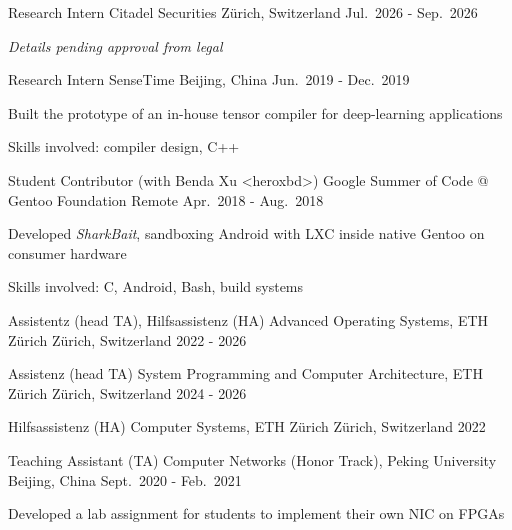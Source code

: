 
\begin{cventries}
    \cventry
    {Research Intern}
    {Citadel Securities}
    {Z\"urich, Switzerland}
    {Jul.\ 2026 - Sep.\ 2026}
    {
        \begin{cvitems}
            \item {\emph{Details pending approval from legal}}
        \end{cvitems}
    }

    \cventry
    {Research Intern}
    {SenseTime}
    {Beijing, China}
    {Jun.\ 2019 - Dec.\ 2019}
    {
        \begin{cvitems}
            \item {Built the prototype of an in-house tensor compiler for
                deep-learning applications}
            \item {Skills involved: compiler design, C++}
        \end{cvitems}
    }

    \cventry
    {Student Contributor (with Benda Xu <heroxbd>)} %
    {Google Summer of Code @ Gentoo Foundation} %
    {Remote} %
    {Apr.\ 2018 - Aug.\ 2018} %
    {
        \begin{cvitems}
            \item {Developed \emph{SharkBait}, sandboxing Android with LXC
                inside native Gentoo on consumer hardware}
            \item {Skills involved: C, Android, Bash, build systems}
        \end{cvitems}
    }
\end{cventries}


\begin{cventries}
    \cventry
    {Assistentz (head TA), Hilfsassistenz (HA)}
    {Advanced Operating Systems, ETH Z\"urich}
    {Z\"urich, Switzerland}
    {2022 - 2026}
    {}

    \cventry
    {Assistenz (head TA)}
    {System Programming and Computer Architecture, ETH Z\"urich}
    {Z\"urich, Switzerland}
    {2024 - 2026}
    {}

    \cventry
    {Hilfsassistenz (HA)}
    {Computer Systems, ETH Z\"urich}
    {Z\"urich, Switzerland}
    {2022}
    {}

    \cventry
    {Teaching Assistant (TA)}
    {Computer Networks (Honor Track), Peking University}
    {Beijing, China}
    {Sept.\ 2020 - Feb.\ 2021}
    {
        \begin{cvitems}
            \item {Developed a lab assignment for students to implement their
                own NIC on FPGAs}
        \end{cvitems}
    }
\end{cventries}

